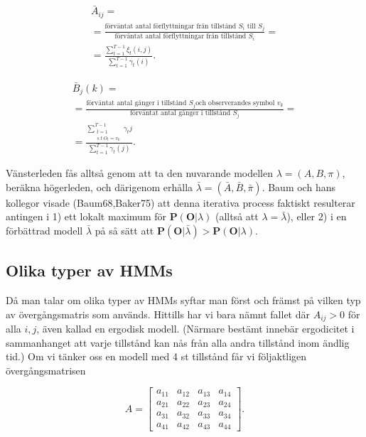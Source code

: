 \documentclass[../rapport_MVEX01-11-05]{subfiles}
\begin{document}
\begin{multline*}
\bar{A}_{ij} = \\ = \frac{\text{förväntat antal förflyttningar från
    tillstånd $S_i$ till $S_j$}}{\text{förväntat antal förflyttningar
    från tillstånd $S_i$}} = \\ =
\frac{\sum_{t=1}^{T-1}\xi_t(i,j)}{\sum_{t=1}^{T-1}\gamma_t(i)}.
\end{multline*}

\begin{multline*}
\bar{B}_j(k) = \\ = \frac{\text{förväntat antal gånger i tillstånd $S_j$
    och observerandes symbol $v_k$}}{\text{förväntat antal gånger i
    tillstånd $S_j$}} = \\ = \frac{\sum_{\substack{t=1\\s.t~ O_t =
      v_k}}^{T-1}\gamma_t{j}}{\sum_{t=1}^{T-1}\gamma_t(j)}.
\end{multline*}

Vänsterleden fås alltså genom att ta den nuvarande modellen $\lambda =
(A,B,\pi)$, beräkna högerleden, och därigenom erhålla $\bar{\lambda} =
(\bar{A},\bar{B}, \bar{\pi})$. Baum och hans kollegor visade
(Baum68,Baker75) att denna iterativa process faktiskt resulterar
antingen i 1) ett lokalt maximum för $\textbf{P}(\textbf{O}|\lambda)$
(alltså att $\lambda = \bar{\lambda}$), eller 2) i en förbättrad
modell $\bar{\lambda}$ på så sätt att
$\textbf{P}(\textbf{O}|\bar{\lambda}) > \textbf{P}(\textbf{O}|\lambda)$. 

\subsection{Olika typer av HMMs}

Då man talar om olika typer av HMMs syftar man först och främst på
vilken typ av övergångsmatris som används. Hittills har vi bara nämnt
fallet där $A_{ij} > 0$ för alla $i,j$, även kallad en ergodisk
modell. (Närmare bestämt innebär ergodicitet i sammanhanget att varje
tillstånd kan nås från alla andra tillstånd inom ändlig tid.) Om vi
tänker oss en modell med 4 st tillstånd får vi följaktligen övergångsmatrisen

\begin{equation*}
A = \begin{bmatrix}
a_{11} & a_{12} & a_{13} & a_{14}\\
a_{21} & a_{22} & a_{23} & a_{24}\\
a_{31} & a_{32} & a_{33} & a_{34}\\
a_{41} & a_{42} & a_{43} & a_{44}\end{bmatrix}.  
\end{equation*} 
\end{document}
